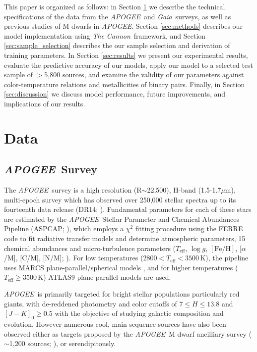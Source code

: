 \documentclass[twocolumn]{aastex62}
\newcommand{\apogee}{\textsl{APOGEE}}
\newcommand{\thecannon}{\textsl{The Cannon}}
\newcommand{\gaia}{\textsl{Gaia}}
\newcommand{\teff}{T_{\mathrm{eff}}}
\newcommand{\logg}{\log g}
\newcommand{\feh}{[{\mathrm{Fe}/\mathrm{H}}]}
\begin{document}
This paper is organized as follows: in Section \ref{sec:data} we describe the technical specifications of the data from the \apogee\ and \gaia\ surveys, as well as previous studies of M dwarfs in \apogee.
Section \ref{sec:methods} describes our model implementation using \thecannon\ framework, and Section \ref{sec:sample_selection} describes the our sample selection and derivation of training parameters.
In Section \ref{sec:results} we present our experimental results, evaluate the predictive accuracy of our models, apply our model to a selected test sample of $>$5,800 sources, and examine the validity of our parameters against color-temperature relations and metallicities of binary pairs.
Finally, in Section \ref{sec:discussion} we discuss model performance, future improvements, and implications of our results. \\


\section{Data} \label{sec:data}

\subsection{\apogee\ Survey}

The \apogee\ survey is a high resolution (R$\sim$22,500), H-band (1.5-1.7$\mu$m), multi-epoch survey which has observed over 250,000 stellar spectra up to its fourteenth data release (DR14; \citealt{Abolfathi:2017}). Fundamental parameters for each of these stars are estimated by the \apogee\ Stellar Parameter and Chemical Abundances Pipeline (ASPCAP; \citealt{Perez:2016}), which employs a $\chi^2$ fitting procedure using the FERRE code to fit radiative transfer models and determine atmospheric parameters, 15 chemical abundances and micro-turbulence parameters ($\teff$, $\logg$, $\feh$, [$\alpha$/M], [C/M], [N/M]; \citealt{Meszaros:2012}). For low temperatures ($2800<\teff<3500$\,K), the pipeline uses MARCS plane-parallel/spherical models \citep{Gustafsson:2008}, and for higher temperatures ($\teff\geq3500$\,K) ATLAS9 \citep{Castelli:2004} plane-parallel models are used.

\apogee\ is primarily targeted for bright stellar populations particularly red giants, with de-reddened photometry and color cutoffs of $7 \leq H \leq 13.8$ and $[J-K]_0 \geq 0.5$ \citep{Zasowski:2013} with the objective of studying galactic composition and evolution. However numerous cool, main sequence sources have also been observed either as targets proposed by the \apogee\ M dwarf ancilliary survey ($\sim$1,200 sources; \citealt{Desphande:2013}), or serendipitously. 
\end{document}

